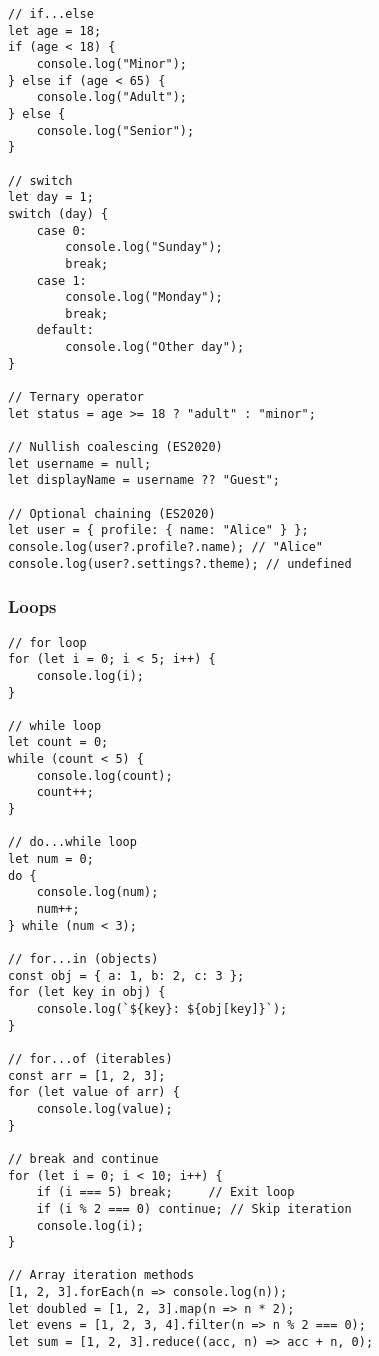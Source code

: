 \documentclass[12pt,a4paper,oneside]{book}
\begin{document}
\begin{lstlisting}[style=javascript, caption={\textbf{Decision Making Structures}}, label=lst:decisions]
// if...else
let age = 18;
if (age < 18) {
    console.log("Minor");
} else if (age < 65) {
    console.log("Adult");
} else {
    console.log("Senior");
}

// switch
let day = 1;
switch (day) {
    case 0:
        console.log("Sunday");
        break;
    case 1:
        console.log("Monday");
        break;
    default:
        console.log("Other day");
}

// Ternary operator
let status = age >= 18 ? "adult" : "minor";

// Nullish coalescing (ES2020)
let username = null;
let displayName = username ?? "Guest";

// Optional chaining (ES2020)
let user = { profile: { name: "Alice" } };
console.log(user?.profile?.name); // "Alice"
console.log(user?.settings?.theme); // undefined
\end{lstlisting}

\subsubsection{Loops}

\begin{lstlisting}[style=javascript, caption={\textbf{Loop Structures}}, label=lst:loops]
// for loop
for (let i = 0; i < 5; i++) {
    console.log(i);
}

// while loop
let count = 0;
while (count < 5) {
    console.log(count);
    count++;
}

// do...while loop
let num = 0;
do {
    console.log(num);
    num++;
} while (num < 3);

// for...in (objects)
const obj = { a: 1, b: 2, c: 3 };
for (let key in obj) {
    console.log(`${key}: ${obj[key]}`);
}

// for...of (iterables)
const arr = [1, 2, 3];
for (let value of arr) {
    console.log(value);
}

// break and continue
for (let i = 0; i < 10; i++) {
    if (i === 5) break;     // Exit loop
    if (i % 2 === 0) continue; // Skip iteration
    console.log(i);
}

// Array iteration methods
[1, 2, 3].forEach(n => console.log(n));
let doubled = [1, 2, 3].map(n => n * 2);
let evens = [1, 2, 3, 4].filter(n => n % 2 === 0);
let sum = [1, 2, 3].reduce((acc, n) => acc + n, 0);
\end{lstlisting}
\end{document}
